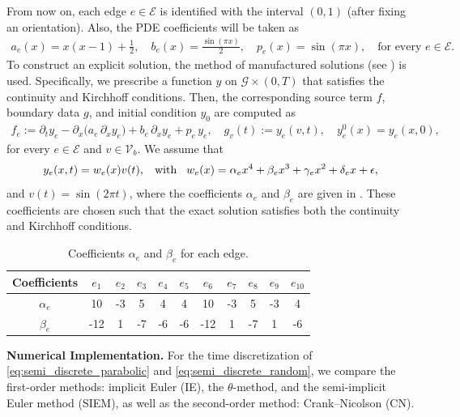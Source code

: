 \documentclass[a4paper, 10pt, english]{article}
\begin{document}
From now on, each edge $e\in\mathcal{E}$ is identified with the interval $(0,1)$ (after fixing an orientation). Also, the PDE coefficients will be taken as 
\begin{align*}
    a_e(x) = x(x-1)+\frac{1}{2},\quad b_e(x) = \frac{\sin(\pi x)}{2},\quad p_e(x)= \sin(\pi x),\quad\text{for every }e\in\mathcal{E}.
\end{align*}
To construct an explicit solution, the method of manufactured solutions (see \cite[Chapter 12]{MR3931345}) is used. Specifically, we prescribe a function $y$ on $\mathcal{G}\times(0,T)$ that satisfies the continuity and Kirchhoff conditions. Then, the corresponding source term $f$, boundary data $g$, and initial condition $y_0$ are computed as
\begin{align*}
    f_e:= \partial_t y_e
- \partial_x\bigl(a_e\,\partial_x y_e \bigr)
+ b_e\,\partial_x y_e
+ p_e\,y_e, \quad g_v(t) := y_e(v,t), \quad y_e^0(x)=y_e(x,0),
\end{align*}
for every $e\in \mathcal{E}$ and $v\in\mathcal{V}_b$. We assume that
\begin{align*}
    y_e(x,t) = w_e(x)v(t), \hspace{0.3cm} \text{with} \hspace{0.3cm} w_e(x)=\alpha_e x^4+\beta_e x^3+\gamma_e x^2+\delta_e x+\epsilon,
\end{align*}
and $ v(t)= \sin(2\pi t)$, where the coefficients $\alpha_e$ and $\beta_e$ are given in . These coefficients are chosen such that the exact solution satisfies both the continuity and Kirchhoff conditions.

\begin{table}[h!]
\centering
\caption{Coefficients $\alpha_e$ and $\beta_e$ for each edge.}\label{tab:coefficients}
\begin{tabular}{c|cccccccccc}
\toprule
        Coefficients      & $e_1$ & $e_2$ & $e_3$ & $e_4$ & $e_5$ & $e_6$ & $e_7$ & $e_8$ & $e_9$ & $e_{10}$ \\
\midrule
$\alpha_e$   & 10      & -3      & 5      & 4      & 4      & 10      & -3      & 5      & -3      & 4       \\
$\beta_e$    & -12     & 1       & -7     & -6     & -6     & -12     & 1       & -7     & 1       & -6      \\
\bottomrule
\end{tabular}
\end{table}

\noindent
\textbf{Numerical Implementation.}
For the time discretization of \eqref{eq:semi_discrete_parabolic} and \eqref{eq:semi_discrete_random}, we compare the first-order methods: implicit Euler (IE), the $\theta$-method, and the semi-implicit Euler method (SIEM), as well as the second-order method: Crank–Nicolson (CN).
\end{document}
